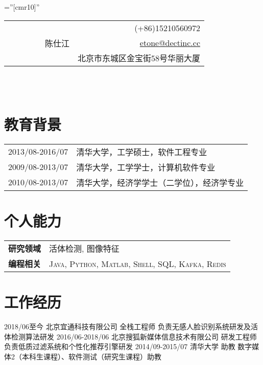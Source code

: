 \documentclass[a4paper,10pt]{professional-cv-cn}
\begin{document}
\pagestyle{empty}

\font\fb=''[cmr10]''

\begin{tabular}{lr}
\multirow{4}{24em}{\Huge ~~~~~~~~~陈仕江}

    & (+86)15210560972 \\

    & \href{mailto:etone@dectinc.cc}{etone@dectinc.cc} \\

    & 北京市东城区金宝街58号华丽大厦
\end{tabular}
\\
\\

\section{教育背景}
\begin{tabular}{rl}
 \textsc{2013/08-2016/07} & 清华大学，工学硕士，软件工程专业 \\
 \textsc{2009/08-2013/07} & 清华大学，工学学士，计算机软件专业 \\
 \textsc{2010/08-2013/07} & 清华大学，经济学学士（二学位），经济学专业
\end{tabular}

\section{个人能力}
\begin{tabular}{rl}
 \textsc{\textbf{研究领域}}& \textsc{活体检测}, \textsc{ 图像特征 }\\
 \textsc{\textbf{编程相关}}& \textsc{Java}, \textsc{Python}, \textsc{Matlab}, \textsc{Shell}, \textsc{SQL}, \textsc{Kafka}, \textsc{Redis}\\
\end{tabular}

\section{工作经历}
\begin{entrylist}
  \internentry
    {2018/06至今}
    {北京宜通科技有限公司}
    {全栈工程师}
    {负责无感人脸识别系统研发及活体检测算法研发}
  \internentry
    {2016/06-2018/06}
    {北京搜狐新媒体信息技术有限公司}
    {研发工程师}
    {负责低质过滤系统和个性化推荐引擎研发}
  \internentry
    {2014/09-2015/07}
    {清华大学}
    {助教}
    {数字媒体2（本科生课程）、软件测试（研究生课程）助教}
\end{entrylist}
\end{document}
